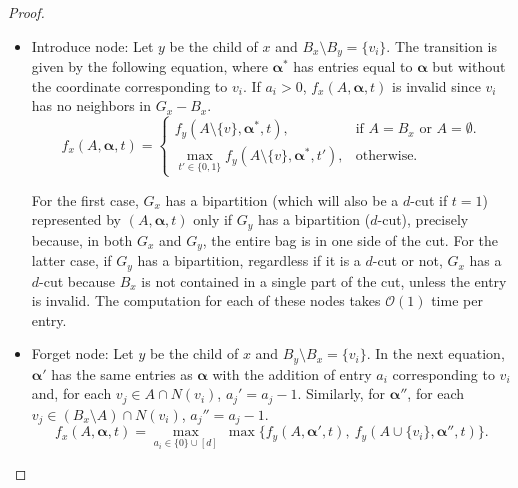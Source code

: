 \documentclass[a4paper,UKenglish,cleveref, autoref]{lipics-v2019}
\newcommand{\ig}[1]{\textcolor{red}{[Ig: #1]}}
\newcommand{\balpha}{\boldsymbol{\alpha}}
\newcommand{\bigO}[1]{\mathcal{O}\!\left(#1\right)}
\begin{document}
\begin{proof}
\begin{itemize}
        \item Introduce node: Let $y$ be the child of $x$ and $B_x \setminus B_y = \{v_i\}$.
        The transition is given by the following equation, where $\balpha^*$ has entries equal to $\balpha$ but without the coordinate corresponding to $v_i$.
        If $a_i > 0$, $f_x(A, \balpha, t)$ is invalid since $v_i$ has no neighbors in $G_x - B_x$.
        \[
     f_x(A, \balpha, t)=\left\{
                \begin{array}{ll}
                  f_y(A \setminus \{v\}, \balpha^*, t), & \text{if $A = B_x$ or $A = \emptyset$.}\\
                  \max_{t' \in \{0,1\}} f_y(A \setminus \{v\}, \balpha^*, t'), & \text{otherwise.}
                \end{array}
              \right.
       \]

        For the first case, $G_x$ has a bipartition (which will also be a $d$-cut if $t=1$)  represented by $(A, \balpha, t)$ only if $G_y$ has a bipartition ($d$-cut), precisely because, in both $G_x$ and $G_y$, the entire bag is in one side of the cut.
        For the latter case, if $G_y$ has a bipartition, regardless if it is a $d$-cut or not, $G_x$ has a $d$-cut %
        because $B_x$ is not contained in a single part of the cut, unless the entry is invalid.
        The computation for each of these nodes takes $\bigO{1}$ time per entry.

        \item Forget node: Let $y$ be the child of $x$ and $B_y \setminus B_x = \{v_i\}$.
        In the next equation, $\balpha'$ has the same entries as $\balpha$ with the addition of entry $a_i$ corresponding to $v_i$ and, for each $v_j \in A \cap N(v_i)$, $a_j' = a_j - 1$.
        Similarly, for $\balpha''$, for each $v_j \in (B_x \setminus A) \cap N(v_i)$, $a_j'' = a_j - 1$.
        \begin{equation*}
            f_x(A, \balpha, t) = \max_{a_i \in \{0\} \cup [d]}\ \max \{ f_y(A, \balpha', t),\  f_y(A \cup \{v_i\}, \balpha'', t)\}.
        \end{equation*}


\end{itemize}
\end{proof}
\end{document}

